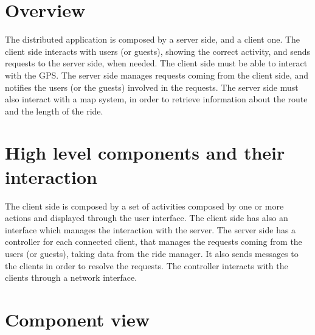 \section{Overview}
The distributed application is composed by a server side, and a client one.
The client side interacts with users (or guests), showing the correct activity, and sends requests to the server side, when needed.
The client side must be able to interact with the GPS.
The server side manages requests coming from the client side, and notifies the users (or the guests) involved in the requests.
The server side must also interact with a map system, in order to retrieve information about the route and the length of the ride.

\section{High level components and their interaction}
The client side is composed by a set of activities composed by one or more actions and displayed through the user interface.
The client side has also an interface which manages the interaction with the server.
The server side has a controller for each connected client, that manages the requests coming from the users (or guests), 
taking data from the ride manager. It also sends messages to the clients in order to resolve the requests.
The controller interacts with the clients through a network interface.
\section{Component view}
